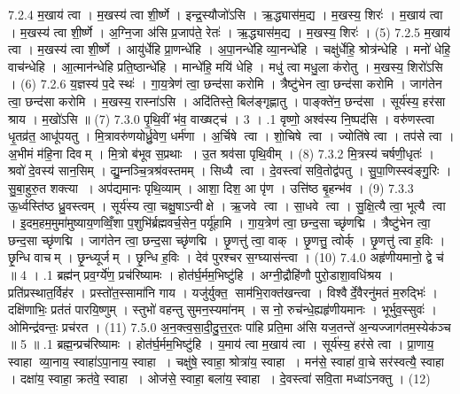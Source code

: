 7.2.4
म॒खाय॑ त्वा । म॒खस्य॑ त्वा शी॒र्ष्णे । इन्द्र॒स्यौजो॑ऽसि । ऋ॒द्ध्यास॑म॒द्य । म॒खस्य॒ शिरः॑ । म॒खाय॑ त्वा । म॒खस्य॑ त्वा शी॒र्ष्णे । अ॒ग्नि॒जा अ॑सि प्र॒जाप॑ते॒ रेतः॑ । ऋ॒द्ध्यास॑म॒द्य । म॒खस्य॒ शिरः॑ । (5)
7.2.5
म॒खाय॑ त्वा । म॒खस्य॑ त्वा शी॒र्ष्णे । आयु॑र्धेहि प्रा॒णन्धे॑हि । अ॒पा॒नन्धे॑हि व्या॒नन्धे॑हि । चक्षु॑र्धेहि॒ श्रोत्र॑न्धेहि । मनो॑ धेहि॒ वाच॑न्धेहि । आ॒त्मान॑न्धेहि प्रति॒ष्ठान्धे॑हि । मान्धे॑हि॒ मयि॑ धेहि । मधु॑ त्वा मधु॒ला क॑रोतु । म॒खस्य॒ शिरो॑ऽसि । (6)
7.2.6
य॒ज्ञस्य॑ प॒दे स्थः॑ । गा॒य॒त्रेण॑ त्वा॒ छन्द॑सा करोमि । त्रैष्टु॑भेन त्वा॒ छन्द॑सा करोमि । जाग॑तेन त्वा॒ छन्द॑सा करोमि । म॒खस्य॒ रास्ना॑ऽसि । अदि॑तिस्ते॒ बिल॑ङ्गृह्णातु । पाङ्क्ते॑न॒ छन्द॑सा । सूर्य॑स्य॒ हर॑सा श्राय । म॒खो॑ऽसि ॥ (7)
7.3.0
पृ॒थि॒वीं भ॑व॒ वाख्षट्च॑ । 3 ।
.1
वृष्णो॒ अश्व॑स्य नि॒ष्पद॑सि । वरु॑णस्त्वा धृ॒तव्र॑त॒ आधू॑पयतु । मि॒त्रावरु॑णयोर्ध्रु॒वेण॒ धर्म॑णा । अ॒र्चिषे त्वा । शो॒चिषे त्वा । ज्योति॑षे त्वा । तप॑से त्वा । अ॒भीमं म॑हि॒ना दिवम् । मि॒त्रो ब॑भूव स॒प्रथाः । उ॒त श्रव॑सा पृथि॒वीम् । (8)
7.3.2
मि॒त्रस्य॑ चर्\mbox{}षणी॒धृतः॑ । श्रवो॑ दे॒वस्य॑ सान॒सिम् । द्यु॒म्नञ्चि॒त्रश्र॑वस्तमम् । सिध्यै त्वा । दे॒वस्त्वा॑ सवि॒तोद्व॑पतु । सु॒पा॒णिस्स्व॑ङ्गु॒रिः । सु॒बा॒हुरु॒त शक्त्या । अप॑द्यमानः पृथि॒व्याम् । आशा॒ दिश॒ आ पृ॑ण । उत्ति॑ष्ठ बृ॒हन्भ॑व । (9)
7.3.3
ऊ॒र्ध्वस्ति॑ष्ठ ध्रु॒वस्त्वम् । सूर्य॑स्य त्वा॒ चक्षु॒षाऽन्वीक्षे । ऋ॒जवे त्वा । सा॒धवे त्वा । सु॒क्षि॒त्यै त्वा॒ भूत्यै त्वा । इ॒दम॒हम॒मुमा॑मुष्याय॒णव्विँ॒शा प॒शुभि॑र्ब्रह्मवर्च॒सेन॒ पर्यू॑हामि । गा॒य॒त्रेण॑ त्वा॒ छन्द॒सा च्छृ॑णद्मि । त्रैष्टु॑भेन त्वा॒ छन्द॒सा च्छृ॑णद्मि । जाग॑तेन त्वा॒ छन्द॒सा च्छृ॑णद्मि । छृ॒णत्तु॑ त्वा॒ वाक् । छृ॒णत्तु॒ त्वोर्क् । छृ॒णत्तु॑ त्वा ह॒विः । छृ॒न्धि वाचम् । छृ॒न्ध्यूर्जम् । छृ॒न्धि ह॒विः । देव॑ पुरश्चर स॒ग्घ्यास॑न्त्वा । (10)
7.4.0
अहृ॑णीयमानो॒ द्वे च॑ ॥ 4 ।
.1
ब्रह्म॑न् प्रव॒र्ग्ये॑ण॒ प्रच॑रिष्यामः । होत॑र्घ॒र्मम॒भिष्टु॑हि । अग्नी॒द्रौहि॑णौ पुरो॒डाशा॒वधि॑श्रय । प्रति॑प्रस्थात॒र्विह॑र । प्रस्तो॑त॒स्सामा॑नि गाय । यजु॑र्युक्त॒ साम॑भि॒राक्त॑खन्त्वा । विश्वैर्दे॒वैरनु॑मतं म॒रुद्भिः॑ । दक्षि॑णाभिः॒ प्रत॑तं पारयि॒ष्णुम् । स्तुभो॑ वहन्तु सुमन॒स्यमा॑नम् । स नो॒ रुच॑न्धे॒ह्यहृ॑णीयमानः । भूर्भुव॒स्सुवः॑ । ओमिन्द्र॑वन्तः॒ प्रच॑रत । (11)
7.5.0
अ॒न॒क्त्व॒सा॒दी॒दु॒त्त॒र॒तः पा॑हि प्रति॒मा अ॑सि यज॒तन्ते॑ अ॒न्यज्जाग॑तम॒स्येक॑ञ्च ॥ 5 ॥
.1
ब्रह्म॒न्प्रच॑रिष्यामः । होत॑र्घ॒र्मम॒भिष्टु॑हि । य॒माय॑ त्वा म॒खाय॑ त्वा । सूर्य॑स्य॒ हर॑से त्वा । प्रा॒णाय॒ स्वाहा व्या॒नाय॒ स्वाहा॑ऽपा॒नाय॒ स्वाहा । चक्षु॑षे॒ स्वाहा॒ श्रोत्रा॑य॒ स्वाहा । मन॑से॒ स्वाहा॑ वा॒चे सर॑स्वत्यै॒ स्वाहा । दक्षा॑य॒ स्वाहा॒ क्रत॑वे॒ स्वाहा । ओज॑से॒ स्वाहा॒ बला॑य॒ स्वाहा । दे॒वस्त्वा॑ सवि॒ता मध्वा॑ऽनक्तु । (12)
